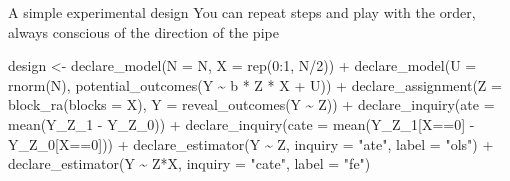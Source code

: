 \documentclass[
  11pt,
  ignorenonframetext,
]{beamer}
\newenvironment{Shaded}{\begin{snugshade}}{\end{snugshade}}
\newcommand{\AttributeTok}[1]{\textcolor[rgb]{0.40,0.45,0.13}{#1}}
\newcommand{\DecValTok}[1]{\textcolor[rgb]{0.68,0.00,0.00}{#1}}
\newcommand{\FunctionTok}[1]{\textcolor[rgb]{0.28,0.35,0.67}{#1}}
\newcommand{\NormalTok}[1]{\textcolor[rgb]{0.00,0.23,0.31}{#1}}
\newcommand{\OtherTok}[1]{\textcolor[rgb]{0.00,0.23,0.31}{#1}}
\newcommand{\SpecialCharTok}[1]{\textcolor[rgb]{0.37,0.37,0.37}{#1}}
\newcommand{\StringTok}[1]{\textcolor[rgb]{0.13,0.47,0.30}{#1}}
\begin{document}
\begin{frame}[fragile]{A simple experimental design}
\protect\hypertarget{a-simple-experimental-design}{}
You can repeat steps and play with the order, always conscious of the
direction of the pipe

\begin{Shaded}
\begin{Highlighting}[]
\NormalTok{design }\OtherTok{\textless{}{-}} 
  \FunctionTok{declare\_model}\NormalTok{(}\AttributeTok{N =}\NormalTok{ N, }\AttributeTok{X =} \FunctionTok{rep}\NormalTok{(}\DecValTok{0}\SpecialCharTok{:}\DecValTok{1}\NormalTok{, N}\SpecialCharTok{/}\DecValTok{2}\NormalTok{)) }\SpecialCharTok{+}
  \FunctionTok{declare\_model}\NormalTok{(}\AttributeTok{U =} \FunctionTok{rnorm}\NormalTok{(N), }\FunctionTok{potential\_outcomes}\NormalTok{(Y }\SpecialCharTok{\textasciitilde{}}\NormalTok{ b }\SpecialCharTok{*}\NormalTok{ Z }\SpecialCharTok{*}\NormalTok{ X }\SpecialCharTok{+}\NormalTok{ U)) }\SpecialCharTok{+} 
  \FunctionTok{declare\_assignment}\NormalTok{(}\AttributeTok{Z =} \FunctionTok{block\_ra}\NormalTok{(}\AttributeTok{blocks =}\NormalTok{ X), }\AttributeTok{Y =} \FunctionTok{reveal\_outcomes}\NormalTok{(Y }\SpecialCharTok{\textasciitilde{}}\NormalTok{ Z)) }\SpecialCharTok{+} 
  \FunctionTok{declare\_inquiry}\NormalTok{(}\AttributeTok{ate =} \FunctionTok{mean}\NormalTok{(Y\_Z\_1 }\SpecialCharTok{{-}}\NormalTok{ Y\_Z\_0)) }\SpecialCharTok{+} 
  \FunctionTok{declare\_inquiry}\NormalTok{(}\AttributeTok{cate =} \FunctionTok{mean}\NormalTok{(Y\_Z\_1[X}\SpecialCharTok{==}\DecValTok{0}\NormalTok{] }\SpecialCharTok{{-}}\NormalTok{ Y\_Z\_0[X}\SpecialCharTok{==}\DecValTok{0}\NormalTok{])) }\SpecialCharTok{+} 
  \FunctionTok{declare\_estimator}\NormalTok{(Y }\SpecialCharTok{\textasciitilde{}}\NormalTok{ Z, }\AttributeTok{inquiry =} \StringTok{"ate"}\NormalTok{, }\AttributeTok{label =} \StringTok{"ols"}\NormalTok{) }\SpecialCharTok{+} 
  \FunctionTok{declare\_estimator}\NormalTok{(Y }\SpecialCharTok{\textasciitilde{}}\NormalTok{ Z}\SpecialCharTok{*}\NormalTok{X, }\AttributeTok{inquiry =} \StringTok{"cate"}\NormalTok{, }\AttributeTok{label =} \StringTok{"fe"}\NormalTok{)}
\end{Highlighting}
\end{Shaded}
\end{frame}
\end{document}
